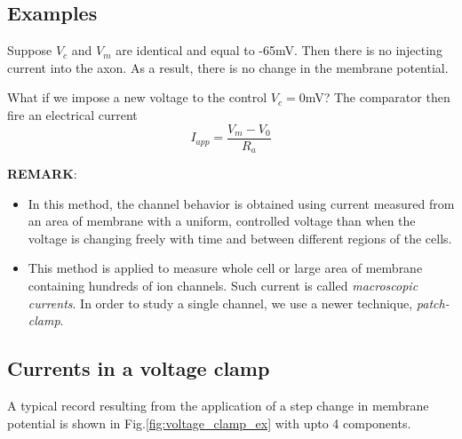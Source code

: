 \subsection{Examples}
\label{sec:examples}

Suppose $V_c$ and $V_m$ are identical and equal to -65mV. Then there
is no injecting current into the axon. As a result, there is no change
in the membrane potential.

What if we impose a new voltage to the control $V_c = 0$mV? The
comparator then fire an electrical current
\begin{equation}
  \label{eq:162}
  I_{app} = \frac{V_m-V_0}{R_a}
\end{equation}


{\bf REMARK}:

\begin{itemize}
\item
In this method, the channel behavior is obtained using
current measured from an area of membrane with a uniform, controlled
voltage than when the voltage is changing freely with time and between
different regions of the cells.

\item
This method is applied to measure whole cell or large area of membrane
containing hundreds of ion channels. Such current is called
{\it macroscopic currents}. In order to study a single channel, we use
a newer technique, {\it patch-clamp}.
\end{itemize}

\subsection{Currents in a voltage clamp}
\label{sec:voltage-clamp-current-components}

A typical record resulting from the application of a step change in membrane
potential is shown in Fig.\ref{fig:voltage_clamp_ex} with upto 4 components.

